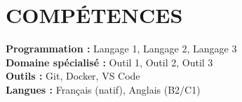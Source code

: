 \section{COMPÉTENCES}
\small{

\textbf{Programmation :} Langage 1, Langage 2, Langage 3 \\

\textbf{Domaine spécialisé :} Outil 1, Outil 2, Outil 3 \\

\textbf{Outils :} Git, Docker, VS Code \\

\textbf{Langues :} Français (natif), Anglais (B2/C1) \\

}
